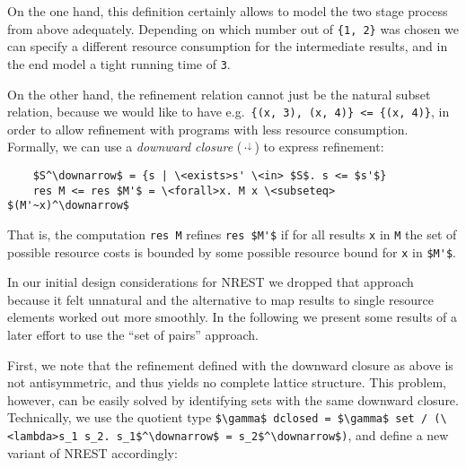 \documentclass[acmsmall]{acmart}
\newcommand{\is}{\lstinline[language=isabelle]}
\begin{document}
On the one hand, this definition certainly allows to model the two stage process from above adequately. 
Depending on which number out of \is!{1, 2}! was chosen we can specify a different resource consumption for the intermediate results, and in the end model a tight running time of \is{3}.

On the other hand, the refinement relation cannot just be the natural subset relation, because we would like to have e.g.\ \is!{(x, 3), (x, 4)} <= {(x, 4)}!, in order to allow refinement with programs with less resource consumption.
Formally, we can use a \emph{downward closure} ($\cdot^\downarrow$) to express refinement:
\begin{lstlisting}
    $S^\downarrow$ = {s | \<exists>s' \<in> $S$. s <= $s'$}
    res M <= res $M'$ = \<forall>x. M x \<subseteq> $(M'~x)^\downarrow$
\end{lstlisting}
That is, the computation \is{res M} refines  \is{res $M'$} if for all results \is{x} in \is{M} the set of possible resource costs is bounded by some possible resource bound for \is{x} in \is{$M'$}. 

In our initial design considerations for NREST  we dropped that approach because it felt unnatural and the alternative to map results to single resource elements worked out more smoothly.
In the following we present some results of a later effort to use the ``set of pairs'' approach.

First, we note that the refinement defined with the downward closure as above is not antisymmetric, and thus yields no complete lattice structure. This problem, however, can be easily solved by identifying sets with the same downward closure. Technically, we use the quotient type \is{$\gamma$ dclosed = $\gamma$ set / (\<lambda>s_1 s_2. s_1$^\downarrow$ = s_2$^\downarrow$)}, and define a new variant of NREST accordingly: 


\end{document}

